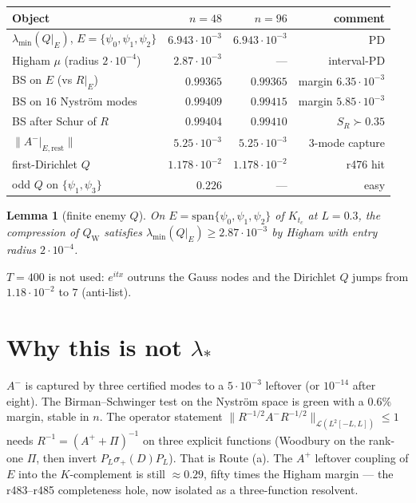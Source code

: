 \documentclass[11pt]{article}
\newtheorem{lemma}{Lemma}
\theoremstyle{remark}
\newcommand{\QW}{Q_{\mathrm W}}
\begin{document}
\begin{center}
\small
\begin{tabular}{@{}lrrr@{}}
\toprule
Object & $n=48$ & $n=96$ & comment \\
\midrule
$\lambda_{\min}(Q|_E)$, $E=\{\psi_0,\psi_1,\psi_2\}$
  & $6.943\cdot10^{-3}$ & $6.943\cdot10^{-3}$ & PD \\
Higham $\mu$ (radius $2\cdot10^{-4}$)
  & $2.87\cdot10^{-3}$ & --- & interval-PD \\
BS on $E$ (vs $R|_E$)
  & $0.99365$ & $0.99365$ & margin $6.35\cdot10^{-3}$ \\
BS on $16$ Nystr\"om modes
  & $0.99409$ & $0.99415$ & margin $5.85\cdot10^{-3}$ \\
BS after Schur of $R$
  & $0.99404$ & $0.99410$ & $S_R\succ0.35$ \\
$\|A^-|_{E,\mathrm{rest}}\|$
  & $5.25\cdot10^{-3}$ & $5.25\cdot10^{-3}$ & 3-mode capture \\
first-Dirichlet $Q$
  & $1.178\cdot10^{-2}$ & $1.178\cdot10^{-2}$ & r476 hit \\
odd $Q$ on $\{\psi_1,\psi_3\}$
  & $0.226$ & --- & easy \\
\bottomrule
\end{tabular}
\end{center}

\begin{lemma}[finite enemy $Q$]
On $E=\mathrm{span}\{\psi_0,\psi_1,\psi_2\}$ of
$K_{t_c}$ at $L=0.3$, the compression of
$\QW$ satisfies
$\lambda_{\min}(Q|_E)\ge2.87\cdot10^{-3}$
by Higham with entry radius $2\cdot10^{-4}$.
\end{lemma}

$T=400$ is not used: $e^{itx}$ outruns the Gauss
nodes and the Dirichlet $Q$ jumps from
$1.18\cdot10^{-2}$ to $7$ (anti-list).

\section{Why this is not $\lambda_*$}

$A^-$ is captured by three certified modes to
a $5\cdot10^{-3}$ leftover
(or $10^{-14}$ after eight).
The Birman--Schwinger test on the Nystr\"om space
is green with a $0.6\%$ margin, stable in $n$.
The operator statement
$\|R^{-1/2}A^-R^{-1/2}\|_{\mathcal L(L^2[-L,L])}\le1$
needs $R^{-1}=(A^++\Pi)^{-1}$ on three explicit
functions (Woodbury on the rank-one $\Pi$, then
invert $P_L\sigma_+(D)P_L$).
That is Route (a).
The $A^+$ leftover coupling of $E$ into the
$K$-complement is still $\approx0.29$, fifty
times the Higham margin --- the r483--r485
completeness hole, now isolated as a
three-function resolvent.
\end{document}
